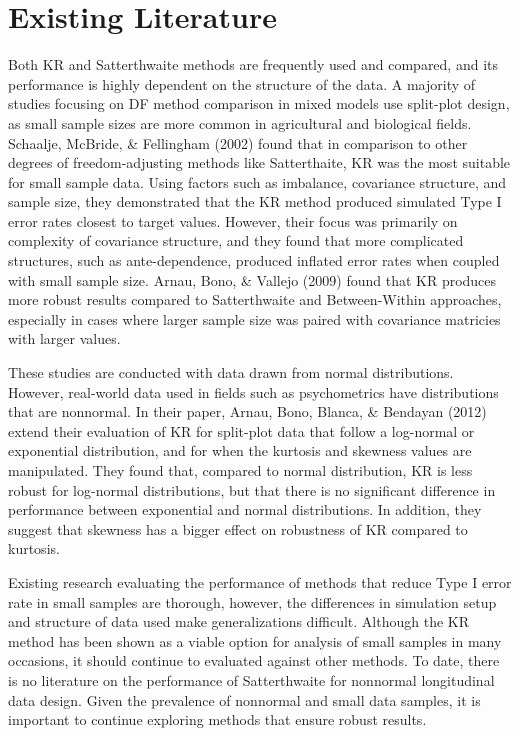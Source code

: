\documentclass[12pt, twoside]{amherstthesis}
\begin{document}
\hypertarget{existing-literature}{%
\section{Existing Literature}\label{existing-literature}}

Both KR and Satterthwaite methods are frequently used and compared, and its performance is highly dependent on the structure of the data.
A majority of studies focusing on DF method comparison in mixed models use split-plot design, as small sample sizes are more common in agricultural and biological fields. Schaalje, McBride, \& Fellingham (2002) found that in comparison to other degrees of freedom-adjusting methods like Satterthaite, KR was the most suitable for small sample data. Using factors such as imbalance, covariance structure, and sample size, they demonstrated that the KR method produced simulated Type I error rates closest to target values. However, their focus was primarily on complexity of covariance structure, and they found that more complicated structures, such as ante-dependence, produced inflated error rates when coupled with small sample size. Arnau, Bono, \& Vallejo (2009) found that KR produces more robust results compared to Satterthwaite and Between-Within approaches, especially in cases where larger sample size was paired with covariance matricies with larger values.

These studies are conducted with data drawn from normal distributions. However, real-world data used in fields such as psychometrics have distributions that are nonnormal. In their paper, Arnau, Bono, Blanca, \& Bendayan (2012) extend their evaluation of KR for split-plot data that follow a log-normal or exponential distribution, and for when the kurtosis and skewness values are manipulated. They found that, compared to normal distribution, KR is less robust for log-normal distributions, but that there is no significant difference in performance between exponential and normal distributions. In addition, they suggest that skewness has a bigger effect on robustness of KR compared to kurtosis.

Existing research evaluating the performance of methods that reduce Type I error rate in small samples are thorough, however, the differences in simulation setup and structure of data used make generalizations difficult. Although the KR method has been shown as a viable option for analysis of small samples in many occasions, it should continue to evaluated against other methods. To date, there is no literature on the performance of Satterthwaite for nonnormal longitudinal data design. Given the prevalence of nonnormal and small data samples, it is important to continue exploring methods that ensure robust results.
\end{document}
